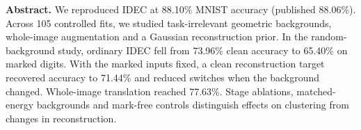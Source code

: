 \textbf{Abstract.} We reproduced IDEC at 88.10\% MNIST accuracy (published 88.06\%). Across 105 controlled fits, we studied task-irrelevant geometric backgrounds, whole-image augmentation and a Gaussian reconstruction prior. In the random-background study, ordinary IDEC fell from 73.96\% clean accuracy to 65.40\% on marked digits. With the marked inputs fixed, a clean reconstruction target recovered accuracy to 71.44\% and reduced switches when the background changed. Whole-image translation reached 77.63\%. Stage ablations, matched-energy backgrounds and mark-free controls distinguish effects on clustering from changes in reconstruction.
